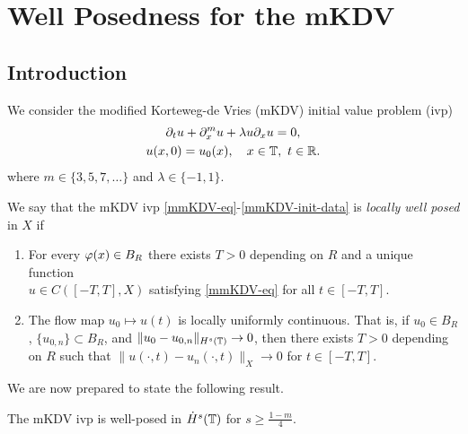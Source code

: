 \chapter{Well Posedness for the mKDV}
%
%
%
%
\section{Introduction}
We consider the modified Korteweg-de Vries (mKDV) initial value problem (ivp)
%
%
\begin{gather}
	\label{mmKDV-eq}
	\partial_t u + \partial_x^{m} u + \lambda u \partial_x u = 0,
	\\
	\label{mmKDV-init-data}
	u(x,0) = u_0(x), \quad x \in \mathbb{T}, \ t \in \mathbb{R}.
\end{gather}
%
%
where $m \in \{3, 5, 7,\dots \}$ and $\lambda \in \{-1, 1\}$.
%
%
\begin{definition}
	We say that the mKDV ivp \eqref{mmKDV-eq}-\eqref{mmKDV-init-data} is
	\emph{locally well posed} in
	$X$ if 
	\begin{enumerate}
		\item For every $\varphi(x) \in
	B_R$ there exists $T>0$ depending on $R$ and a unique function
	\\
	$u \in C([-T, T],
	X)$ satisfying \eqref{mmKDV-eq} for all $t \in [-T, T]$. 
\item The flow map $u_0 \mapsto u(t)$ is locally uniformly continuous. That is, if $u_0
	\in B_R$, $\{u_{0,n}\} \subset B_R$, and 
	$\|u_0 - u_{0, n} \|_{H^{s}(\mathbb{T})} \to 0$, then there exists $T >0$ depending
	on $R$ such that $\|u(\cdot, t) - u_{n}(\cdot,t) \|_{X} \to
	0$ for $t \in [-T, T]$. 
	\end{enumerate}
\end{definition}
%
%
We are now prepared to state the following result.
%
%
%
%
%
%
%
\begin{theorem}
	\label{mthm:main}
	The mKDV ivp is well-posed in $\dot{H}^s(\mathbb{T})$ for $s \ge \frac{1-m}{4}$.  
\end{theorem}
%
%
%
%
%
%
%
%
